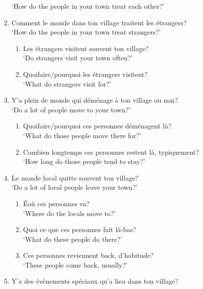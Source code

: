 \documentclass{article}
\begin{document}
\begin{enumerate}
                  `How do the people in your town treat each other?'
            \item Comment le monde dans ton village traitent les étrangers?\\
                  `How do the people in your town treat strangers?'
            \begin{enumerate}
                \item Les étrangers visitent souvent ton village?\\
                      `Do strangers visit your town often?'
                \item Quoifaire/pourquoi les étrangers visitent?\\
                      `What do strangers visit for?'
            \end{enumerate}
            \item Y'a plein de monde qui déménage à ton village ou non?\\
                  `Do a lot of people move to your town?'
            \begin{enumerate}
                \item Quoifaire/pourquoi ces personnes déménagent là?\\
                      `What do those people move there for?'
                \item Combien longtemps ces personnes restent là, typiquement?\\
                      `How long do those people tend to stay?'
            \end{enumerate}
            \item Le monde local quitte souvent ton village?\\
                  `Do a lot of local people leave your town?'
            \begin{enumerate}
                \item Éoù ces personnes va?\\
                      `Where do the locals move to?'
                \item Quoi ce que ces personnes fait là-bas?\\
                      `What do these people do there?'
                \item Ces personnes reviennent back, d'habitude?\\
                      `These people come back, usually?'
            \end{enumerate}
            \item Y'a des événements spéciaux qu'a lieu dans ton village?\\

\end{enumerate}
\end{document}
